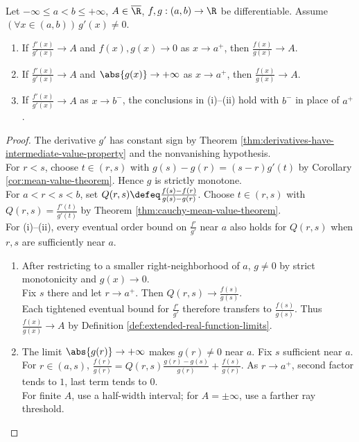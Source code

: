 \begin{theorem} \label{thm:lhospital-one-sided} \\
Let $-\infty\leq a<b\leq+\infty$, $A\in\overline{\R}$, $f,g:(a,b)\to\R$ be differentiable. Assume $(\forall x\in(a,b))\,g'(x)\neq0$.
\begin{enumerate}[label=(\roman*)]
\setlength{\itemsep}{0pt}
\item If $\frac{f'(x)}{g'(x)}\to A$ and $f(x),g(x)\to0$ as $x\to a^+$, then $\frac{f(x)}{g(x)}\to A$.
\item If $\frac{f'(x)}{g'(x)}\to A$ and $\abs{g(x)}\to+\infty$ as $x\to a^+$, then $\frac{f(x)}{g(x)}\to A$.
\item If $\frac{f'(x)}{g'(x)}\to A$ as $x\to b^-$, the conclusions in (i)--(ii) hold with $b^-$ in place of $a^+$.
\end{enumerate}
\begin{proof}
The derivative $g'$ has constant sign by Theorem \ref{thm:derivatives-have-intermediate-value-property} and the nonvanishing hypothesis.\\
For $r<s$, choose $t\in(r,s)$ with $g(s)-g(r)=(s-r)g'(t)$ by Corollary \ref{cor:mean-value-theorem}. Hence $g$ is strictly monotone.\\
For $a<r<s<b$, set $Q(r,s)\defeq\frac{f(s)-f(r)}{g(s)-g(r)}$. Choose $t\in(r,s)$ with $Q(r,s)=\frac{f'(t)}{g'(t)}$ by Theorem \ref{thm:cauchy-mean-value-theorem}.\\
For (i)--(ii), every eventual order bound on $\frac{f'}{g'}$ near $a$ also holds for $Q(r,s)$ when $r,s$ are sufficiently near $a$.
\begin{enumerate}[label=(\roman*)]
\setlength{\itemsep}{0pt}
\item After restricting to a smaller right-neighborhood of $a$, $g\neq0$ by strict monotonicity and $g(x)\to0$.\\
Fix $s$ there and let $r\to a^+$. Then $Q(r,s)\to\frac{f(s)}{g(s)}$.\\
Each tightened eventual bound for $\frac{f'}{g'}$ therefore transfers to $\frac{f(s)}{g(s)}$. Thus $\frac{f(x)}{g(x)}\to A$ by Definition \ref{def:extended-real-function-limits}.
\item The limit $\abs{g(r)}\to+\infty$ makes $g(r)\neq0$ near $a$. Fix $s$ sufficient near $a$.\\
For $r\in(a,s)$, $\frac{f(r)}{g(r)}=Q(r,s)\frac{g(r)-g(s)}{g(r)}+\frac{f(s)}{g(r)}$. As $r\to a^+$, second factor tends to $1$, last term tends to $0$.\\
For finite $A$, use a half-width interval; for $A=\pm\infty$, use a farther ray threshold.\\

\end{enumerate}
\end{proof}
\end{theorem}
